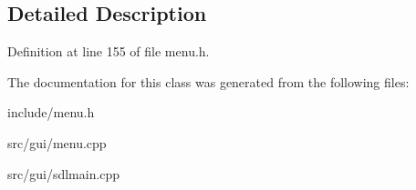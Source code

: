 \subsection{Detailed Description}


Definition at line 155 of file menu.\-h.



The documentation for this class was generated from the following files\-:\begin{DoxyCompactItemize}
\item 
include/menu.\-h\item 
src/gui/menu.\-cpp\item 
src/gui/sdlmain.\-cpp\end{DoxyCompactItemize}
